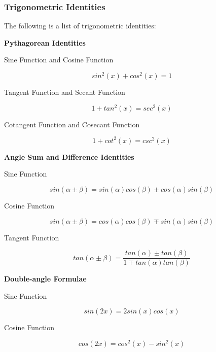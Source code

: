 \documentclass[a4paper,12pt]{article}
\begin{document}
\subsubsection{Trigonometric Identities}
\begin{thm}
  The following is a list of trigonometric identities:

  \begin{alist}
    \item \textbf{Pythagorean Identities}
    \begin{rlist}
      \item Sine Function and Cosine Function

      $$sin^{2}(x)+cos^{2}(x)=1$$

      \item Tangent Function and Secant Function

      $$1+tan^{2}(x)=sec^{2}(x)$$

      \item Cotangent Function and Cosecant Function

      $$1+cot^{2}(x)=csc^{2}(x)$$

    \end{rlist}
    \item \textbf{Angle Sum and Difference Identities}
    \begin{rlist}
      \item Sine Function

      $$sin(\alpha\pm \beta)=sin(\alpha)cos(\beta)\pm cos(\alpha)sin(\beta)$$

      \item Cosine Function

      $$sin(\alpha\pm \beta)=cos(\alpha)cos(\beta)\mp sin(\alpha)sin(\beta)$$

      \item Tangent Function

      $$tan(\alpha\pm \beta)=\frac{tan(\alpha)\pm tan(\beta)}{1\mp tan(\alpha)tan(\beta)}$$

    \end{rlist}
    \item \textbf{Double-angle Formulae}
    \begin{rlist}
      \item Sine Function

      $$sin(2x)=2sin(x)cos(x)$$

      \item Cosine Function

      $$cos(2x)=cos^{2}(x)-sin^{2}(x)$$


\end{rlist}
\end{alist}
\end{thm}
\end{document}

